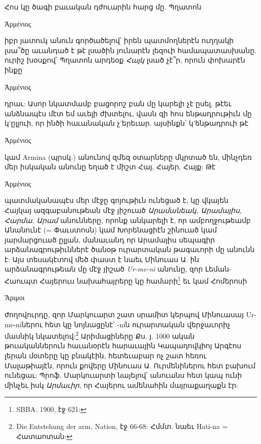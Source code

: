 \documentclass{article}
\begin{document}
{Հոս կը ծագի բաւական դժուարին հարց մը. Պղատոն \begin{greek}Ἀρμένιος\end{greek} իբր յատուկ անուն գործածելով՝ իրեն պատմողներէն ուղղակի լսա՞ծը աւանդած է թէ լսածին յունարէն լեզուի համապատասխանը. ուրիշ խօսքով՝ Պղատոն արդեօք \emph{Հայկ} լսած չէ՞ր, որուն փոխարէն ինքը \begin{greek}Ἀρμένιος\end{greek} դրաւ: Ասոր նկատմամբ բացորոշ բան մը կարելի չէ ըսել. թէեւ անձնապէս մէտ եմ աւելի ժխտելու, վասն զի հոս ենթադրութիւն մը կ'ըլլուի, որ ինծի հաւանական չ'երեւար. այսինքն՝ կ'ենթադրուի թէ \begin{greek}Ἀρμένιος\end{greek} կամ Armina (պրսկ.) անունով զմեզ օտարները մկրտած են, մինչդեռ մեր իսկական անունը եղած է միշտ Հայ, Հայեր, Հայք: Թէ \begin{greek}Ἀρμένιος\end{greek} պատմականապէս մեր մէջը գոյութիւն ունեցած է, կը վկայեն Հայկայ ազգաբանութեան մէջ յիշուած \emph{Արամանեակ, Արամայիս, Հարմա, Արամ} անունները, որոնք անկարելի է, որ ամբողջութեամբ Անանունէ (= Փաւստոսն) կամ Խորենացիէն շինուած կամ յարմարցուած ըլլան, մանաւանդ որ Արամայիս սեպագիր արձանագրութիւններէ ծանօթ ուրարտական թագաւորի մը անունն է: Այս տեսակէտով մեծ փաստ է նաեւ Մինուաս Ա. ին արձանագրութեան մը մէջ յիշած \emph{Ur-me-ni} անունը, զոր Լեման-Հաուպտ Հայերուս նախահայրերը կը համարի\footnote{SBBA. 1900, էջ 621:} եւ կամ Հոմերոսի \begin{greek}Ἄριμοι\end{greek} ժողովուրդը, զոր Մարկուարտ շատ սրամիտ կերպով Մինուասայ Ur-me-niներու հետ կը նոյնացընէ՝ -niն ուրարտական վերջաւորիչ մասնիկ նկատելով:\footnote{Die Entstehung der arm. Nation, էջ 66-68: Հմմտ. նաեւ Hati-na = Հատաոտան:} Արիմացիները Քս. յ. 1000 ական թուականներուն հաւանօրէն հարաւային Կապադովկիոյ Արգէոս լերան մօտերը կը բնակէին, հետեւաբար ոչ շատ հեռու Մալաթիայէն, որուն քովերը Մինուաս Ա. Ուրմենիներու հետ բախում ունեցաւ: Պրոֆ. Մարկուարտի նայելով՝ անուանս հետ կապ ունի մինչեւ իսկ \emph{Արմաւիր}, որ Հայերու ամենահին մայրաքաղաքն էր:

}
\end{document}
